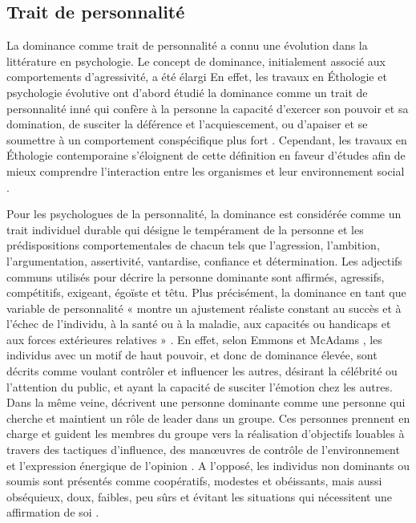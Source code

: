 \subsection{Trait de personnalité}


La dominance comme trait de personnalité a connu une évolution dans la littérature en psychologie. Le concept de dominance, initialement associé aux comportements d'agressivité, a été élargi \cite{burgoon1995interpersonal}
En effet, les travaux en Éthologie et psychologie évolutive ont d'abord étudié la dominance comme un trait de personnalité inné qui confère à la personne la capacité d'exercer son pouvoir et sa domination, de susciter la déférence et l'acquiescement, ou d'apaiser et se soumettre à un comportement conspécifique plus fort \cite{keltner1995signs,burgoon2006nonverbal}. Cependant, les travaux en Éthologie contemporaine s'éloignent de cette définition en faveur d'études afin de mieux comprendre l'interaction entre les organismes et leur environnement social \cite{burgoon2006nonverbal}.

Pour les psychologues de la personnalité, la dominance est considérée comme un trait individuel durable qui désigne le tempérament de la personne et les prédispositions comportementales de chacun \cite{cattell1970handbook,ridgeway1987nonverbal} tels que l'agression, l'ambition, l'argumentation,
assertivité, vantardise, confiance et détermination.
Les adjectifs communs utilisés pour décrire la personne dominante sont affirmés, agressifs, compétitifs, exigeant, égoïste et têtu. Plus précisément, la dominance en tant que variable de personnalité « montre un ajustement réaliste constant au succès et à l'échec de l'individu, à la santé ou à la maladie, aux capacités ou handicaps et aux forces extérieures relatives » \cite{cattell1970handbook,burgoon1998nature}.
En effet, selon  Emmons et McAdams \cite{emmons1991personal}, les individus avec un motif de haut pouvoir, et donc de dominance élevée, sont décrits comme voulant contrôler et influencer les autres, désirant la célébrité ou l'attention du public, et ayant la capacité de susciter l'émotion chez les autres. Dans la même veine, \cite{jackson1974personality} décrivent une personne dominante comme une personne qui cherche et maintient un rôle de leader dans un groupe. Ces personnes prennent en charge et guident les membres du groupe vers la réalisation d'objectifs louables à travers des tactiques d'influence, des manœuvres de contrôle de l'environnement et l'expression énergique de l'opinion \cite{burgoon1998nature}. 
A l'opposé, les individus non dominants ou soumis sont présentés comme coopératifs, modestes et obéissants, mais aussi obséquieux, doux, faibles, peu sûrs et évitant les situations qui nécessitent une affirmation de soi \cite{burgoon1998nature}. 


